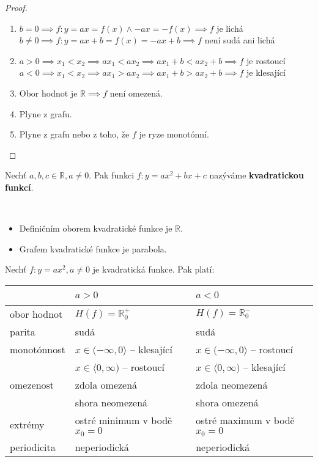 \begin{proof}\,
  \begin{enumerate}[$i.$]
    \item $b=0 \implies f:y= ax = f(x) \land -ax = -f(x) \implies f$ je lichá\\
          $b\neq 0 \implies f:y = ax + b = f(x) = -ax + b \implies f$ není sudá ani lichá
    \item $a>0 \implies x_1 < x_2 \implies ax_1 < ax_2 \implies ax_1 + b < ax_2 + b \implies f$ je rostoucí\\
          $a<0 \implies x_1 < x_2 \implies ax_1 > ax_2 \implies ax_1 + b > ax_2 + b \implies f$ je klesající
    \item Obor hodnot je $\mathbb R \implies f$ není omezená.
    \item Plyne z grafu.
    \item Plyne z grafu nebo z toho, že $f$ je ryze monotónní. \qedhere
  \end{enumerate}
\end{proof}

\begin{definition}
  Nechť $a,b,c \in \mathbb R, a \neq 0$. Pak funkci $f:y = ax^2 + bx+ c$ nazýváme \textbf{kvadratickou funkcí}.
\end{definition}

\begin{pozn}\,
  \begin{itemize}
    \item Definičním oborem kvadratické funkce je $\mathbb R$.
    \item Grafem kvadratické funkce je parabola.
  \end{itemize}
\end{pozn}

\begin{veta}
  Nechť $f:y = ax^2, a \neq 0$ je kvadratická funkce. Pak platí:\\
  \begin{center}
    \begin{tabularx}{\textwidth}{ l | l  l }
        \, & $a>0$ & $a<0$ \\
        \hline
        obor hodnot & $H(f) = \mathbb R^{+}_0$ & $H(f) = \mathbb R^{-}_0$ \\
        parita & sudá & sudá \\
        monotónnost & $x \in (-\infty, 0\rangle$ -- klesající & $x \in (-\infty, 0\rangle$ -- rostoucí \\
        \, & $x \in \langle 0, \infty)$ -- rostoucí & $x \in \langle 0, \infty)$ -- klesající \\
        omezenost & zdola omezená & zdola neomezená \\
        \, & shora neomezená & shora omezená \\
        extrémy &  ostré minimum v bodě $x_0=0$ & ostré maximum v bodě $x_0=0$ \\
        periodicita & neperiodická & neperiodická
    \end{tabularx}
  \end{center}
\end{veta}

